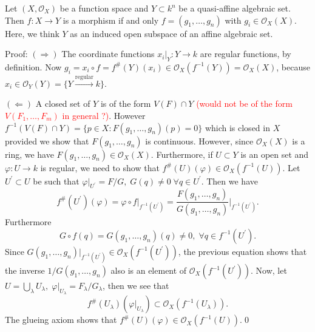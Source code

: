 \begin{dang}
    \begin{lemma}\label{lemma: coordinate criteria to a map be a morphism of function spaces}
        Let $(X,\mathcal{O}_X)$ be a function space and $Y\subset k^n$ be a quasi-affine algebraic set. 
        Then $f:X\to Y$ is a morphism if and only $f=(g_1,\dots,g_n)$ with $g_i\in\mathcal{O}_X(X)$. Here, 
        we think $Y$ as an induced open subspace of an affine algebraic set.
    \end{lemma}
\end{dang}
Proof: $(\Rightarrow)$ The coordinate functions $x_i|_Y:Y\to k$ are regular functions, by definition. Now 
$g_i = x_i\circ f = f^\#(Y)(x_i)\in\mathcal{O}_X(f^{-1}(Y))=\mathcal{O}_X(X)$, because 
$x_i\in\mathcal{O}_Y(Y)=\{Y\overset{\text{regular}}{\to}k\}$.\par 
$(\Leftarrow)$ A closed set of $Y$ is of the form $V(F)\cap Y$ 
\textcolor{red}{(would not be of the form $V(F_1,\dots, F_m)$ in general ?)}. However
$f^{-1}(V(F)\cap Y)=\{p\in X: F(g_1,\dots, g_n)(p)=0\}$ which is closed in $X$ provided we show that 
$F(g_1,\dots, g_n)$ is continuous. However, since $\mathcal{O}_X(X)$ is a ring, we have $F(g_1,\dots, g_n)\in\mathcal{O}_X(X)$. 
Furthermore, if $U\subset Y$ is an open set and $\varphi:U\to k$ is regular, we need to show that 
$f^{\#}(U)(\varphi)\in\mathcal{O}_X(f^{-1}(U))$. Let $U^\prime\subset U$ be such that 
$\varphi|_{U^\prime}=F/G,\;G(q)\neq0\;\forall q\in U^\prime$. Then we have 
\begin{equation}
    f^\#(U^\prime)(\varphi)=\varphi\circ f|_{f^{-1}(U^\prime)} = 
    \frac{F(g_1,\dots, g_n)}{G(g_1,\dots, g_n)}\bigg|_{f^{-1}(U^\prime)}.
\end{equation}
Furthermore 
\begin{equation}
    G\circ f(q) = G(g_1,\dots, g_n)(q) \neq 0,\;\forall q\in f^{-1}(U^\prime).
\end{equation}
Since $G(g_1,\dots,g_n)|_{f^{-1}(U^\prime)}\in\mathcal{O}_X(f^{-1}(U^\prime))$, the previous equation 
shows that the inverse $1/G(g_1,\dots,g_n)$ also is an element of $\mathcal{O}_X(f^{-1}(U^\prime))$. Now, let 
$U=\bigcup_\lambda U_\lambda,\;\varphi|_{U_\lambda}=F_\lambda/G_\lambda$, then we see that 
\begin{equation}
    f^\#(U_\lambda)(\varphi|_{U_\lambda})\subset \mathcal{O}_X(f^{-1}(U_\lambda)).
\end{equation}
The glueing axiom shows that $f^\#(U)(\varphi)\in\mathcal{O}_X(f^{-1}(U))$.\qed


